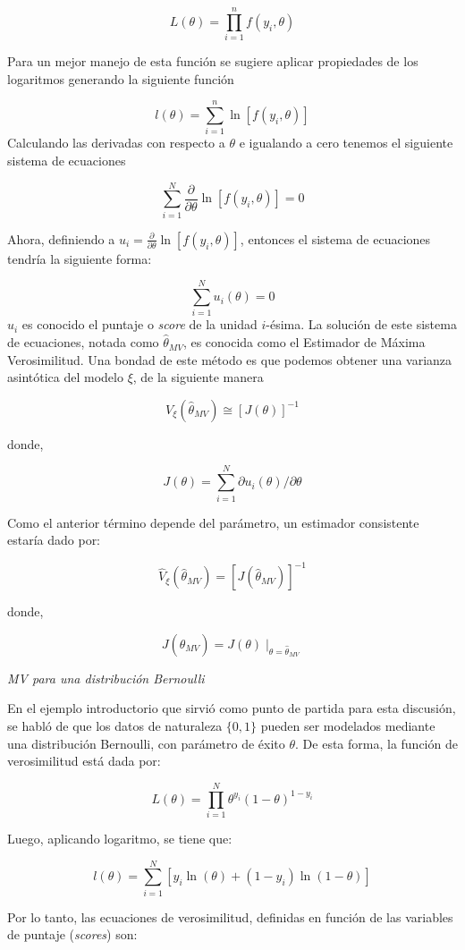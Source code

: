 \documentclass[
  spanish,
  12pt,
]{book}
\begin{document}
\[
L(\theta)=\prod_{i=1}^{n}f(y_{i},\theta)
\]

Para un mejor manejo de esta función se sugiere aplicar propiedades de los logaritmos generando la siguiente función

\[
l(\theta)=\sum_{i=1}^{n}\ln[f(y_{i},\theta)]
\]
Calculando las derivadas con respecto a \(\theta\) e igualando a cero tenemos el siguiente sistema de ecuaciones

\[
\sum_{i=1}^{N}\frac{\partial}{\partial\theta}\ln[f(y_{i},\theta)]=0
\]

Ahora, definiendo a \(u_{i}=\frac{\partial}{\partial\theta}\ln[f(y_{i},\theta)]\), entonces el sistema de ecuaciones tendría la siguiente forma:

\[
\sum_{i=1}^{N}u_{i}(\theta)=0
\]
\(u_{i}\) es conocido el puntaje o \emph{score} de la unidad \(i\)-ésima. La solución de este sistema de ecuaciones, notada como \(\hat{\theta}_{MV}\), es conocida como el Estimador de Máxima Verosimilitud. Una bondad de este método es que podemos obtener una varianza asintótica del modelo \(\xi\), de la siguiente manera

\[
V_{\xi}(\hat{\theta}_{MV})\cong[J(\theta)]^{-1}
\]

donde,

\[
J(\theta)=\sum_{i=1}^{N}\partial u_{i}(\theta)/\partial\theta
\]

Como el anterior término depende del parámetro, un estimador consistente estaría dado por:

\[
\hat{V}_{\xi}(\hat{\theta}_{MV})=[J(\hat{\theta}_{MV})]^{-1}
\]

donde,

\[
J(\hat{\theta}_{MV})=J(\theta)\mid_{\theta=\hat{\theta}_{MV}}
\]

\emph{MV para una distribución Bernoulli}

En el ejemplo introductorio que sirvió como punto de partida para esta discusión, se habló de que los datos de naturaleza \(\{0,1\}\) pueden ser modelados mediante una distribución Bernoulli, con parámetro de éxito \(\theta\). De esta forma, la función de verosimilitud está dada por:

\[
L(\theta)  =\prod_{i=1}^{N}\theta^{y_{i}}(1-\theta)^{1-y_{i}}
\]

Luego, aplicando logaritmo, se tiene que:

\[
l(\theta)  =\sum_{i=1}^{N}\left[{y_{i}}\ln(\theta)+(1-y_{i})\ln(1-\theta)\right]
\]

Por lo tanto, las ecuaciones de verosimilitud, definidas en función de las variables de puntaje (\emph{scores}) son:
\end{document}
